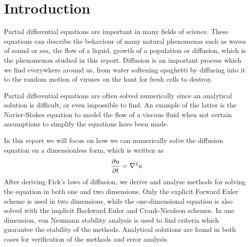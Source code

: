 \section{Introduction}
Partial differential equations are important in many fields of science. These equations can describe the behaviour of many natural phenomenas such as waves of sound or sea, the flow of a liquid, growth of a population or diffusion, which is the phenomenon studied in this report. Diffusion is an important process which we find everywhere around us, from water softening spaghetti by diffusing into it to the random motion of viruses on the hunt for fresh cells to destroy.

Partial differential equations are often solved numerically since an analytical solution is difficult, or even impossible to find. An example of the latter is the Navier-Stokes equation to model the flow of a viscous fluid when not certain assumptions to simplify the equations have been made.

In this report we will focus on how we can numerically solve the diffusion equation on a dimensionless form, which is written as
\begin{equation}\label{eq:diffusion}
\begin{aligned}
\pdv{u}{t} = \nabla^2 u
\end{aligned}
\end{equation}
After deriving Fick's laws of diffusion, we derive and analyse methods for solving the equation in both one and two dimensions. Only the explicit Forward Euler scheme is used in two dimensions, while the one-dimensional equation is also solved with the implicit Backward Euler and Crank-Nicolson schemes. In one dimension, von Neumann stability analysis is used to find criteria which guarantee the stability of the methods. Analytical solutions are found in both cases for verification of the methods and error analysis.

